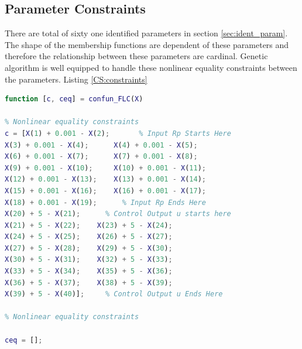 \subsection{Parameter Constraints}
There are total of sixty one identified parameters in section \ref{sec:ident_param}. The shape of the membership functions are dependent of these parameters and therefore the relationship between these parameters are cardinal. Genetic algorithm is well equipped to handle these nonlinear equality constraints between the parameters. Listing \ref{CS:constraints}
\begin{lstlisting}[language=Matlab,caption={Describing nonlinear equality constraints},label=CS:constraints]
function [c, ceq] = confun_FLC(X)

% Nonlinear equality constraints
c = [X(1) + 0.001 - X(2);       % Input Rp Starts Here
X(3) + 0.001 - X(4);      X(4) + 0.001 - X(5);
X(6) + 0.001 - X(7);      X(7) + 0.001 - X(8);
X(9) + 0.001 - X(10);     X(10) + 0.001 - X(11);
X(12) + 0.001 - X(13);    X(13) + 0.001 - X(14);
X(15) + 0.001 - X(16);    X(16) + 0.001 - X(17);
X(18) + 0.001 - X(19);      % Input Rp Ends Here
X(20) + 5 - X(21);      % Control Output u starts here
X(21) + 5 - X(22);    X(23) + 5 - X(24);
X(24) + 5 - X(25);    X(26) + 5 - X(27);
X(27) + 5 - X(28);    X(29) + 5 - X(30);
X(30) + 5 - X(31);    X(32) + 5 - X(33);
X(33) + 5 - X(34);    X(35) + 5 - X(36);
X(36) + 5 - X(37);    X(38) + 5 - X(39);
X(39) + 5 - X(40)];     % Control Output u Ends Here

% Nonlinear equality constraints

ceq = [];
\end{lstlisting}

